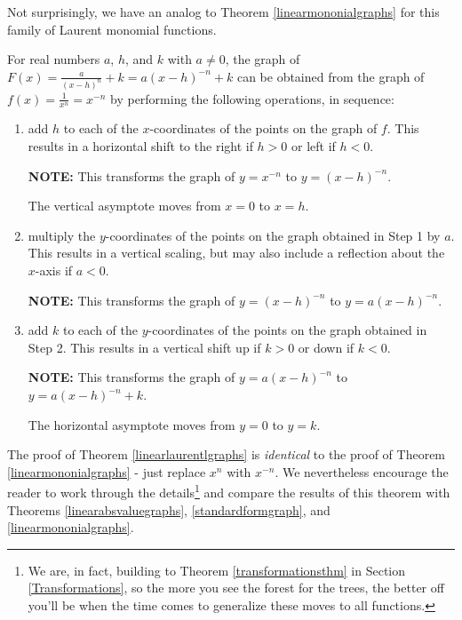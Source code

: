 Not surprisingly, we have an analog to Theorem \ref{linearmononialgraphs} for this family of Laurent monomial functions.

\begin{tcolorbox}

\begin{thm} \label{linearlaurentlgraphs}  For real numbers $a$, $h$, and $k$ with $a \neq 0$, the graph of $F(x) = \frac{a}{(x-h)^n}+k =  a(x-h)^{-n}+k$  can be obtained from the graph of $f(x) = \frac{1}{x^n}= x^{-n}$ by performing the following operations, in sequence:

\begin{enumerate}

\item  add $h$ to each of the $x$-coordinates of the points on the graph of $f$.  This results in a horizontal shift to the right if $h > 0$ or left if $h < 0$.

\textbf{NOTE:}  This transforms the graph of $y = x^{-n}$ to $y = (x-h)^{-n}$.   

The vertical asymptote moves from $x=0$ to $x=h$.

\item  multiply the $y$-coordinates of the points on the graph obtained in Step 1 by $a$.   This results in a vertical scaling, but may also include a reflection about the $x$-axis if $a < 0$.

\textbf{NOTE:}  This transforms the graph of $y = (x-h)^{-n}$ to $y = a(x-h)^{-n}$.

\item  add $k$ to each of the $y$-coordinates of the points on the graph obtained in Step 2.  This results in a vertical shift up if $k > 0$ or down if $k< 0$.

\textbf{NOTE:}  This transforms the graph of  $y = a(x-h)^{-n}$ to $y = a(x-h)^{-n}+k$.

The  horizontal asymptote moves from $y=0$ to $y=k$.

\end{enumerate}

\end{thm}

\end{tcolorbox}

The proof of Theorem \ref{linearlaurentlgraphs} is \textit{identical} to the proof of Theorem \ref{linearmononialgraphs} - just replace $x^n$ with $x^{-n}$.  We nevertheless encourage the reader to work through the details\footnote{We are, in fact, building to Theorem \ref{transformationsthm} in Section \ref{Transformations}, so the more you see the forest for the trees, the better off you'll be when the time comes to generalize these moves to all functions.} and compare the results of this theorem with Theorems \ref{linearabsvaluegraphs}, \ref{standardformgraph}, and  \ref{linearmononialgraphs}.

